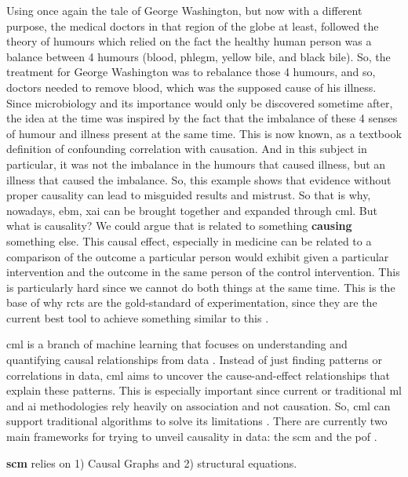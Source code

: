 Using once again the tale of George Washington, but now with a different purpose, the medical doctors in that region of the globe at least, followed the theory of humours which relied on the fact the healthy human person was a balance between 4 humours (blood, phlegm, yellow bile, and black bile). So, the treatment for George Washington was to rebalance those 4 humours, and so, doctors needed to remove blood, which was the supposed cause of his illness. Since microbiology and its importance would only be discovered sometime after, the idea at the time was inspired by the fact that the imbalance of these 4 senses of humour and illness present at the same time.
This is now known, as a textbook definition of confounding correlation with causation. And in this subject in particular, it was not the imbalance in the humours that caused illness, but an illness that caused the imbalance.
So, this example shows that evidence without proper causality can lead to misguided results and mistrust.
So that is why, nowadays, \ac{ebm}, \ac{xai} can be brought together and expanded through \ac{cml}.
But what is causality? We could argue that is related to something \textbf{causing} something else. This causal effect, especially in medicine can be related to a comparison of the outcome a particular person would exhibit given a particular intervention and the outcome in the same person of the control intervention. This is particularly hard since we cannot do both things at the same time.  This is the base of why \acp{rct} are the gold-standard of experimentation, since they are the current best tool to achieve something similar to this \cite{10.7551/mitpress/14244.001.0001}.

\ac{cml} is a branch of machine learning that focuses on understanding and quantifying causal relationships from data \cite{hernanDefinitionCausalEffect2004}. Instead of just finding patterns or correlations in data, \ac{cml} aims to uncover the cause-and-effect relationships that explain these patterns.
This is especially important since current or traditional \ac{ml} and \ac{ai} methodologies rely heavily on association and not causation. So, \ac{cml} can support traditional algorithms to solve its limitations \cite{pearlTheoreticalImpedimentsMachine2018}.
There are currently two main frameworks for trying to unveil causality in data: the \ac{scm}  and the \ac{pof} \cite{shiLearningCausalEffects2022b}.

\textbf{\ac{scm}} relies on 1) Causal Graphs and 2) structural equations.

